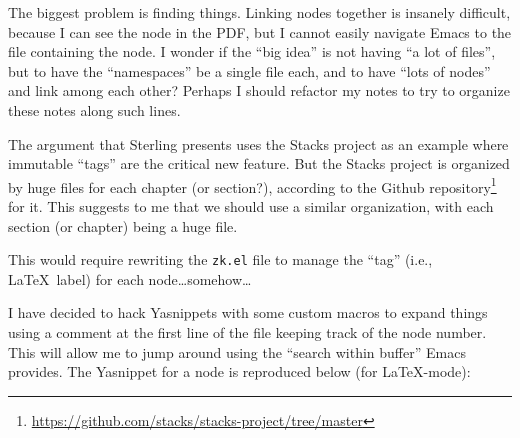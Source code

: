 \begin{node}\label{amn-0005}%
The biggest problem is finding things. Linking nodes together is
insanely difficult, because I can see the node in the PDF, but I cannot
easily navigate Emacs to the file containing the node. I wonder if the
``big idea'' is not having ``a lot of files'', but to have the
``namespaces'' be a single file each, and to have ``lots of nodes'' and
link among each other? Perhaps I should refactor my notes to try to
organize these notes along such lines.

The argument that Sterling presents uses the Stacks project as an
example where immutable ``tags'' are the critical new feature. But the
Stacks project is organized by huge files for each chapter (or
section?), according to the Github repository\footnote{\url{https://github.com/stacks/stacks-project/tree/master}} for it.
This suggests to me that we should use a similar organization, with each
section (or chapter) being a huge file.

This would require rewriting the \verb|zk.el| file to manage the ``tag''
(i.e., \LaTeX\ label) for each node\dots somehow\dots

\begin{node}\label{amn-0006}
I have decided to hack Yasnippets with some custom macros to expand
things using a comment at the first line of the file keeping track of
the node number. This will allow me to jump around using the ``search
within buffer'' Emacs provides. The Yasnippet for a node is reproduced
below (for \LaTeX-mode):

%
\end{node}
\end{node}
